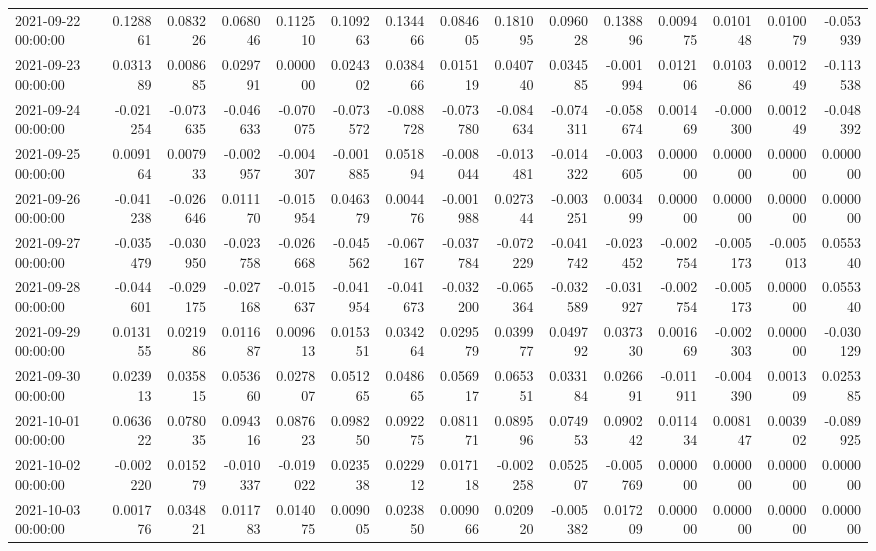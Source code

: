 \begin{tabular}{lrrrrrrrrrrrrrr}
2021-09-22 00:00:00 & 0.128861 & 0.083226 & 0.068046 & 0.112510 & 0.109263 & 0.134466 & 0.084605 & 0.181095 & 0.096028 & 0.138896 & 0.009475 & 0.010148 & 0.010079 & -0.053939 \\
2021-09-23 00:00:00 & 0.031389 & 0.008685 & 0.029791 & 0.000000 & 0.024302 & 0.038466 & 0.015119 & 0.040740 & 0.034585 & -0.001994 & 0.012106 & 0.010386 & 0.001249 & -0.113538 \\
2021-09-24 00:00:00 & -0.021254 & -0.073635 & -0.046633 & -0.070075 & -0.073572 & -0.088728 & -0.073780 & -0.084634 & -0.074311 & -0.058674 & 0.001469 & -0.000300 & 0.001249 & -0.048392 \\
2021-09-25 00:00:00 & 0.009164 & 0.007933 & -0.002957 & -0.004307 & -0.001885 & 0.051894 & -0.008044 & -0.013481 & -0.014322 & -0.003605 & 0.000000 & 0.000000 & 0.000000 & 0.000000 \\
2021-09-26 00:00:00 & -0.041238 & -0.026646 & 0.011170 & -0.015954 & 0.046379 & 0.004476 & -0.001988 & 0.027344 & -0.003251 & 0.003499 & 0.000000 & 0.000000 & 0.000000 & 0.000000 \\
2021-09-27 00:00:00 & -0.035479 & -0.030950 & -0.023758 & -0.026668 & -0.045562 & -0.067167 & -0.037784 & -0.072229 & -0.041742 & -0.023452 & -0.002754 & -0.005173 & -0.005013 & 0.055340 \\
2021-09-28 00:00:00 & -0.044601 & -0.029175 & -0.027168 & -0.015637 & -0.041954 & -0.041673 & -0.032200 & -0.065364 & -0.032589 & -0.031927 & -0.002754 & -0.005173 & 0.000000 & 0.055340 \\
2021-09-29 00:00:00 & 0.013155 & 0.021986 & 0.011687 & 0.009613 & 0.015351 & 0.034264 & 0.029579 & 0.039977 & 0.049792 & 0.037330 & 0.001669 & -0.002303 & 0.000000 & -0.030129 \\
2021-09-30 00:00:00 & 0.023913 & 0.035815 & 0.053660 & 0.027807 & 0.051265 & 0.048665 & 0.056917 & 0.065351 & 0.033184 & 0.026691 & -0.011911 & -0.004390 & 0.001309 & 0.025385 \\
2021-10-01 00:00:00 & 0.063622 & 0.078035 & 0.094316 & 0.087623 & 0.098250 & 0.092275 & 0.081171 & 0.089596 & 0.074953 & 0.090242 & 0.011434 & 0.008147 & 0.003902 & -0.089925 \\
2021-10-02 00:00:00 & -0.002220 & 0.015279 & -0.010337 & -0.019022 & 0.023538 & 0.022912 & 0.017118 & -0.002258 & 0.052507 & -0.005769 & 0.000000 & 0.000000 & 0.000000 & 0.000000 \\
2021-10-03 00:00:00 & 0.001776 & 0.034821 & 0.011783 & 0.014075 & 0.009005 & 0.023850 & 0.009066 & 0.020920 & -0.005382 & 0.017209 & 0.000000 & 0.000000 & 0.000000 & 0.000000 \\

\end{tabular}
